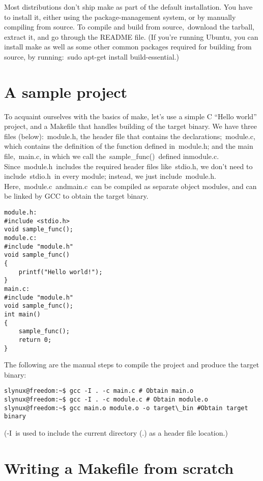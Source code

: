 \documentclass[12pt]{article}
\begin{document}
Most distributions don’t ship make as part of the default installation. You have to install it, either using the package-management system, or by manually compiling from source. To compile and build from source, download the tarball, extract it, and go through the README file. (If you’re running Ubuntu, you can install make as well as some other common packages required for building from source, by running: sudo apt-get install build-essential.)

\section *{A sample project}

To acquaint ourselves with the basics of make, let’s use a simple C “Hello world” project, and a Makefile that handles building of the target binary. We have three files (below): module.h, the header file that contains the declarations; module.c, which contains the definition of the function defined in module.h; and the main file, main.c, in which we call the sample\_func() defined inmodule.c. Since module.h includes the required header files like stdio.h, we don’t need to include stdio.h in every module; instead, we just include module.h. Here, module.c andmain.c can be compiled as separate object modules, and can be linked by GCC to obtain the target binary.

\begin{verbatim}
module.h:
#include <stdio.h>
void sample_func();
module.c:
#include "module.h"
void sample_func()
{
    printf("Hello world!");
}
main.c:
#include "module.h"
void sample_func();
int main()
{
    sample_func();
    return 0;
}
\end{verbatim}

The following are the manual steps to compile the project and produce the target binary:

\begin{verbatim}
slynux@freedom:~$ gcc -I . -c main.c # Obtain main.o
slynux@freedom:~$ gcc -I . -c module.c # Obtain module.o
slynux@freedom:~$ gcc main.o module.o -o target\_bin #Obtain target binary
\end{verbatim}

(-I is used to include the current directory (.) as a header file location.)

\section *{Writing a Makefile from scratch}
\end{document}
